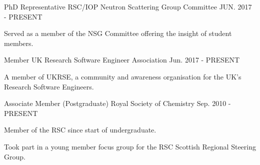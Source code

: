 \begin{cventries}
  \cventry 
  	{PhD Representative}
    {RSC/IOP Neutron Scattering Group Committee}
    {}
    {JUN. 2017 - PRESENT}
    {
      \begin{cvitems}
      	\item {Served as a member of the NSG Committee offering the insight of student members.}
	  \end{cvitems}
	}
  \cventry
    {Member}
    {UK Research Software Engineer Association}
    {}
    {Jun. 2017 - PRESENT}
    {
	  \begin{cvitems}
	  	\item{A member of UKRSE, a community and awareness organisation for the UK's Research Software Engineers.}
	  \end{cvitems}	
    }
  \cventry
    {Associate Member (Postgraduate)}
    {Royal Society of Chemistry}
    {}
    {Sep. 2010 - PRESENT}
    {
      \begin{cvitems}
      	\item {Member of the RSC since start of undergraduate.}
        \item {Took part in a young member focus group for the RSC Scottish Regional Steering Group.}
      \end{cvitems}
    }
\end{cventries}


